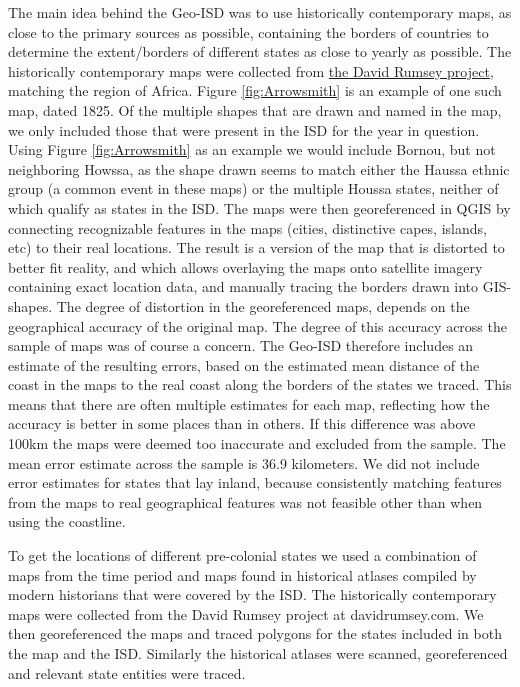 \documentclass[12pt]{article}
\begin{document}
The main idea behind the Geo-ISD was to use historically contemporary maps, as
close to the primary sources as possible, containing the borders of countries to
determine the extent/borders of different states as close to yearly as possible.
The historically contemporary maps were collected from
\href{https://www.davidrumsey.com}{the David Rumsey project}, matching the
region of Africa. Figure \ref{fig:Arrowsmith} is an example of one such map,
dated 1825. Of the multiple shapes that are drawn and named in the map, we only
included those that were present in the ISD for the year in question. Using
Figure \ref{fig:Arrowsmith} as an example we would include Bornou, but not
neighboring Howssa, as the shape drawn seems to match either the Haussa ethnic
group (a common event in these maps) or the multiple Houssa states, neither of
which qualify as states in the ISD. The maps were then georeferenced in QGIS by
connecting recognizable features in the maps (cities, distinctive capes,
islands, etc) to their real locations. The result is a version of the map that
is distorted to better fit reality, and which allows overlaying the maps onto
satellite imagery containing exact location data, and manually tracing the
borders drawn into GIS-shapes. The degree of distortion in the georeferenced
maps, depends on the geographical accuracy of the original map. The degree of
this accuracy across the sample of maps was of course a concern. The Geo-ISD
therefore includes an estimate of the resulting errors, based on the estimated
mean distance of the coast in the maps to the real coast along the borders of
the states we traced. This means that there are often multiple estimates for
each map, reflecting how the accuracy is better in some places than in others.
If this difference was above 100km the maps were deemed too inaccurate and
excluded from the sample. The mean error estimate across the sample is 36.9
kilometers. We did not include error estimates for states that lay inland,
because consistently matching features from the maps to real geographical
features was not feasible other than when using the coastline.

To get the locations of different pre-colonial states we used a combination of
maps from the time period and maps found in historical atlases compiled by
modern historians that were covered by the ISD. The historically contemporary
maps were collected from the David Rumsey project at davidrumsey.com. We then
georeferenced the maps and traced polygons for the states included in both the
map and the ISD. Similarly the historical atlases were scanned, georeferenced
and relevant state entities were traced.
\end{document}
